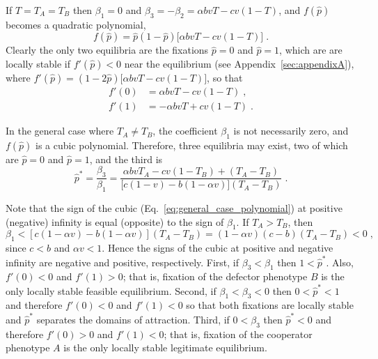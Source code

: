 \documentclass[12pt]{extarticle}
\begin{document}
\begin{appendices}
If $T=T_A=T_B$ then $\beta_1=0$ and $\beta_3=-\beta_2=\alpha b vT -cv(1-T)$, and $f(\hat{p})$ becomes a quadratic polynomial,
\begin{equation} \label{eq:equal_horizontal_transmission}
  f(\hat{p}) = \hat{p}(1-\hat{p})\big[\alpha bvT - cv(1-T)\big] \;.
\end{equation}
Clearly the only two equilibria are the fixations $\hat{p} =  0$ and $\hat{p} = 1$, which are are locally stable if $f'(\hat{p})<0$ near the equilibrium (see Appendix~\ref{sec:appendixA}), where
$f'(\hat{p})=(1-2\hat{p})\big[\alpha bvT - cv(1-T)\big]$, so that
\begin{equation} \label{eq:derivative_of_phattag-phat}
\begin{aligned}
	f'(0) &=	\alpha bvT - cv(1-T) \;, \\
	f'(1) &=	-\alpha bvT + cv(1-T) \;.
\end{aligned}
\end{equation}

In the general case where $T_A \neq T_B$, the coefficient $\beta_1$ is not necessarily zero, and $f(\hat{p})$ is a cubic polynomial.
Therefore, three equilibria may exist, two of which are
$\hat{p} = 0 $ and $\hat{p} = 1$, and the third is
\begin{equation} \label{eq:general_equilibrium_appendix}
  \hat{p}^* =  
  \frac{\beta_3}{\beta_1} =
  \frac{\alpha bvT_A - cv(1-T_B) + (T_A-T_B)}{\big[c(1-v) - b (1-\alpha v)\big] (T_A-T_B)} \;.
\end{equation}

Note that the sign of the  cubic (Eq.\ \ref{eq:general_case_polynomial}) at positive (negative) infinity is equal (opposite) to the sign of $\beta_1$. 
If $T_A>T_B$, then 
\begin{equation} \label{eq:beta1}
   \beta_1 < [c(1-\alpha v) - b(1-\alpha v)] (T_A-T_B) 
   = (1-\alpha v)(c-b)(T_A-T_B) < 0 \;,
 \end{equation}
since $c<b$ and $\alpha v < 1$. Hence the signs of the cubic at positive and negative infinity are negative and positive, respectively.
First, if $\beta_3<\beta_1$ then 
$1<\hat{p}^*$. Also, $f'(0)<0$ and $f'(1)>0$; that is, fixation of the defector phenotype $B$ is the only locally stable feasible equilibrium.
Second, if $\beta_1<\beta_3<0$ then 
$0<\hat{p}^*<1$ and therefore $f'(0)<0$ and $f'(1)<0$ so that both fixations are locally stable and $\hat{p}^*$ separates the domains of attraction.
Third, if $0<\beta_3$ then 
$\hat{p}^*<0$ and therefore $f'(0)>0$ and $f'(1)<0$; that is, fixation of the cooperator phenotype $A$ is the only locally stable legitimate equilibrium.


\end{appendices}
\end{document}
